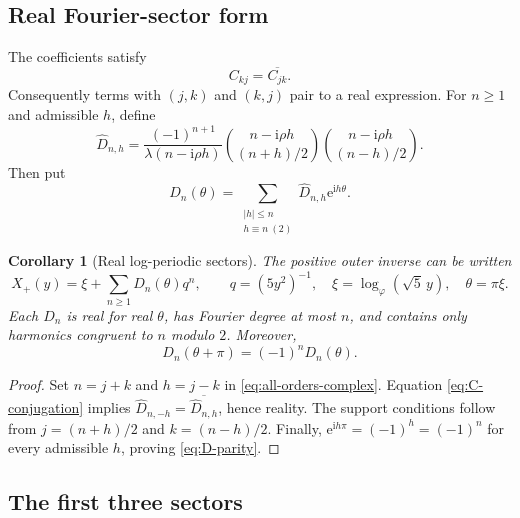 \documentclass[11pt,oneside]{article}
\numberwithin{equation}{section}
\theoremstyle{plain}
\newtheorem{corollary}[theorem]{Corollary}
\theoremstyle{definition}
\theoremstyle{remark}
\newcommand{\e}{\mathrm e}
\newcommand{\ii}{\mathrm i}
\begin{document}
\subsection{Real Fourier-sector form}

The coefficients satisfy
\begin{equation}\label{eq:C-conjugation}
 C_{kj}=\overline{C_{jk}}.
\end{equation}
Consequently terms with \((j,k)\) and \((k,j)\) pair to a real expression.
For \(n\ge1\) and admissible \(h\), define
\begin{equation}\label{eq:dhat-nh}
 \widehat D_{n,h}=
 \frac{(-1)^{n+1}}{\lambda(n-\ii\rho h)}
 \binom{n-\ii\rho h}{(n+h)/2}
 \binom{n-\ii\rho h}{(n-h)/2}.
\end{equation}
Then put
\begin{equation}\label{eq:Dn-definition}
 D_n(\theta)=
 \sum_{\substack{|h|\le n\\h\equiv n\ (2)}}
 \widehat D_{n,h}\e^{\ii h\theta}.
\end{equation}

\begin{corollary}[Real log-periodic sectors]\label{cor:real-sectors}
The positive outer inverse can be written
\begin{equation}\label{eq:all-orders-real}
 \boxed{
 X_+(y)=\xi+\sum_{n\ge1}D_n(\theta)q^n,
 \qquad
 q=(5y^2)^{-1},\quad
 \xi=\log_{\varphi}(\sqrt5\,y),\quad
 \theta=\pi\xi.
 }
\end{equation}
Each \(D_n\) is real for real \(\theta\), has Fourier degree at most \(n\),
and contains only harmonics congruent to \(n\) modulo \(2\).  Moreover,
\begin{equation}\label{eq:D-parity}
 D_n(\theta+\pi)=(-1)^nD_n(\theta).
\end{equation}
\end{corollary}

\begin{proof}
Set \(n=j+k\) and \(h=j-k\) in \cref{eq:all-orders-complex}.
Equation \cref{eq:C-conjugation} implies
\(
 \widehat D_{n,-h}=\overline{\widehat D_{n,h}}
\), hence reality.  The support conditions follow from
\(j=(n+h)/2\) and \(k=(n-h)/2\).  Finally,
\(\e^{\ii h\pi}=(-1)^h=(-1)^n\) for every admissible \(h\), proving
\cref{eq:D-parity}.
\end{proof}

\subsection{The first three sectors}
\end{document}

